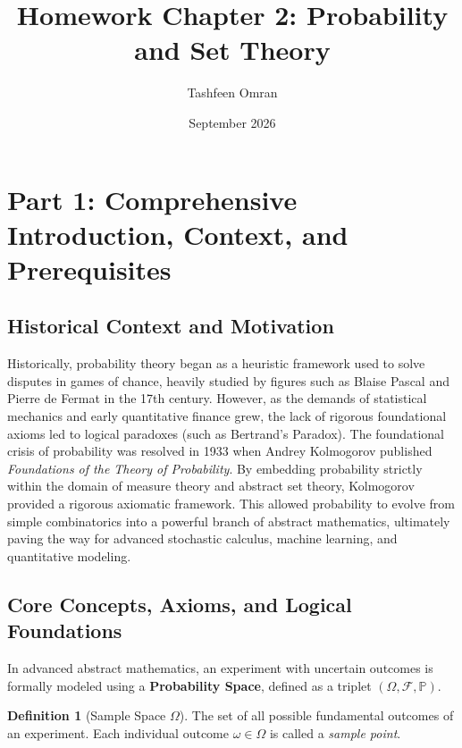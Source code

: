 \documentclass[11pt, letterpaper]{article}
\title{\textbf{Homework Chapter 2: Probability and Set Theory}}
\author{Tashfeen Omran}
\date{September 2026}
\theoremstyle{definition}
\newtheorem{definition}[theorem]{Definition}
\theoremstyle{remark}
\newcommand{\F}{\mathcal{F}}
\newcommand{\Prob}{\mathbb{P}}
\begin{document}
\maketitle
\tableofcontents
\newpage

\section{Part 1: Comprehensive Introduction, Context, and Prerequisites}

\subsection{Historical Context and Motivation}
Historically, probability theory began as a heuristic framework used to solve disputes in games of chance, heavily studied by figures such as Blaise Pascal and Pierre de Fermat in the 17th century. However, as the demands of statistical mechanics and early quantitative finance grew, the lack of rigorous foundational axioms led to logical paradoxes (such as Bertrand's Paradox). The foundational crisis of probability was resolved in 1933 when Andrey Kolmogorov published \textit{Foundations of the Theory of Probability}. By embedding probability strictly within the domain of measure theory and abstract set theory, Kolmogorov provided a rigorous axiomatic framework. This allowed probability to evolve from simple combinatorics into a powerful branch of abstract mathematics, ultimately paving the way for advanced stochastic calculus, machine learning, and quantitative modeling.

\subsection{Core Concepts, Axioms, and Logical Foundations}
In advanced abstract mathematics, an experiment with uncertain outcomes is formally modeled using a \textbf{Probability Space}, defined as a triplet $(\Omega, \F, \Prob)$.

\begin{definition}[Sample Space $\Omega$]
    The set of all possible fundamental outcomes of an experiment. Each individual outcome $\omega \in \Omega$ is called a \textit{sample point}.
\end{definition}
\end{document}
